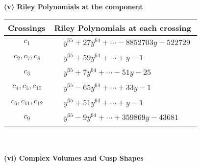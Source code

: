 \documentclass[1p]{elsarticle_modified}
\theoremstyle{definition}
\begin{document}
\newpage\renewcommand{\arraystretch}{1}
\flushleft \textbf{(v) Riley Polynomials at the component}\newline \\
\begin{tabular}{m{50pt}|m{274pt}}
Crossings & \hspace{64pt}Riley Polynomials at each crossing \\
\hline $$\begin{aligned}c_{1}\end{aligned}$$&$\begin{aligned}
&y^{65}+27 y^{64}+\cdots-8852703 y-522729
\end{aligned}$\\
\hline $$\begin{aligned}c_{2},c_{7},c_{8}\end{aligned}$$&$\begin{aligned}
&y^{65}+59 y^{64}+\cdots+y-1
\end{aligned}$\\
\hline $$\begin{aligned}c_{3}\end{aligned}$$&$\begin{aligned}
&y^{65}+7 y^{64}+\cdots-51 y-25
\end{aligned}$\\
\hline $$\begin{aligned}c_{4},c_{5},c_{10}\end{aligned}$$&$\begin{aligned}
&y^{65}-65 y^{64}+\cdots+33 y-1
\end{aligned}$\\
\hline $$\begin{aligned}c_{6},c_{11},c_{12}\end{aligned}$$&$\begin{aligned}
&y^{65}+51 y^{64}+\cdots+y-1
\end{aligned}$\\
\hline $$\begin{aligned}c_{9}\end{aligned}$$&$\begin{aligned}
&y^{65}-9 y^{64}+\cdots+359869 y-43681
\end{aligned}$\\
\hline
\end{tabular}\\~\\
\newpage\flushleft \textbf{(vi) Complex Volumes and Cusp Shapes}
\end{document}
